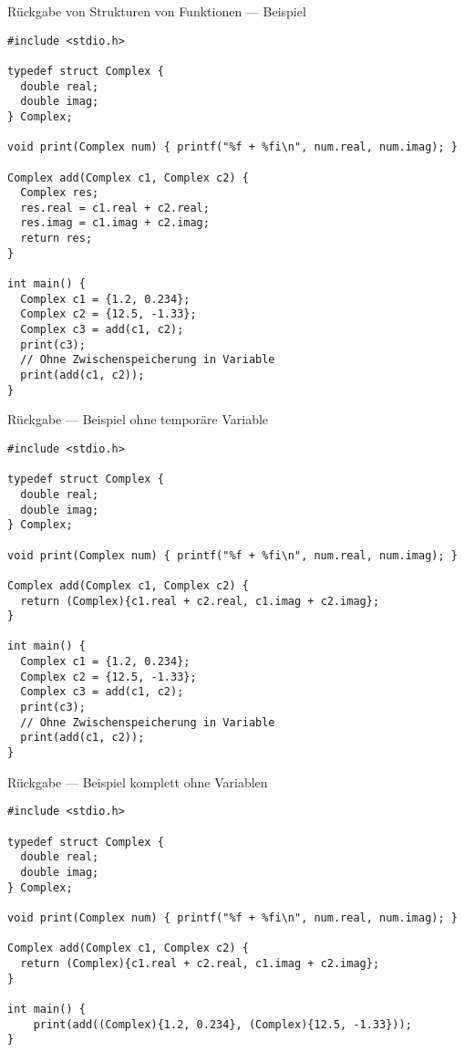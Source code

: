 \documentclass[presentation]{beamer}
\begin{document}
\begin{frame}[label={sec:orge287bfd},fragile]{Rückgabe von Strukturen von Funktionen --- Beispiel}
 \begin{verbatim}
#include <stdio.h>

typedef struct Complex {
  double real;
  double imag;
} Complex;

void print(Complex num) { printf("%f + %fi\n", num.real, num.imag); }

Complex add(Complex c1, Complex c2) {
  Complex res;
  res.real = c1.real + c2.real;
  res.imag = c1.imag + c2.imag;
  return res;
}

int main() {
  Complex c1 = {1.2, 0.234};
  Complex c2 = {12.5, -1.33};
  Complex c3 = add(c1, c2);
  print(c3);
  // Ohne Zwischenspeicherung in Variable
  print(add(c1, c2));
}
\end{verbatim}
\end{frame}
\begin{frame}[label={sec:orgecad1cb},fragile]{Rückgabe --- Beispiel ohne temporäre Variable}
 \begin{verbatim}
#include <stdio.h>

typedef struct Complex {
  double real;
  double imag;
} Complex;

void print(Complex num) { printf("%f + %fi\n", num.real, num.imag); }

Complex add(Complex c1, Complex c2) {
  return (Complex){c1.real + c2.real, c1.imag + c2.imag};
}

int main() {
  Complex c1 = {1.2, 0.234};
  Complex c2 = {12.5, -1.33};
  Complex c3 = add(c1, c2);
  print(c3);
  // Ohne Zwischenspeicherung in Variable
  print(add(c1, c2));
}
\end{verbatim}
\end{frame}
\begin{frame}[label={sec:org841f0e1},fragile]{Rückgabe --- Beispiel komplett ohne Variablen}
 \begin{verbatim}
#include <stdio.h>

typedef struct Complex {
  double real;
  double imag;
} Complex;

void print(Complex num) { printf("%f + %fi\n", num.real, num.imag); }

Complex add(Complex c1, Complex c2) {
  return (Complex){c1.real + c2.real, c1.imag + c2.imag};
}

int main() {
    print(add((Complex){1.2, 0.234}, (Complex){12.5, -1.33}));
}
\end{verbatim}
\end{frame}
\end{document}
